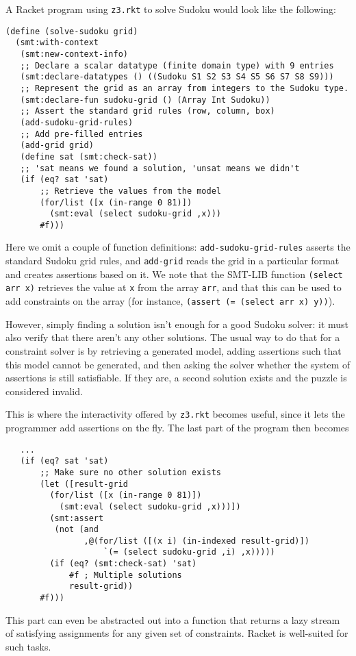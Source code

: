 A Racket program using \texttt{z3.rkt} to solve Sudoku would
look like the following:

\begin{verbatim}
(define (solve-sudoku grid)
  (smt:with-context
   (smt:new-context-info)
   ;; Declare a scalar datatype (finite domain type) with 9 entries
   (smt:declare-datatypes () ((Sudoku S1 S2 S3 S4 S5 S6 S7 S8 S9)))
   ;; Represent the grid as an array from integers to the Sudoku type.
   (smt:declare-fun sudoku-grid () (Array Int Sudoku))
   ;; Assert the standard grid rules (row, column, box)
   (add-sudoku-grid-rules)
   ;; Add pre-filled entries
   (add-grid grid)
   (define sat (smt:check-sat))
   ;; 'sat means we found a solution, 'unsat means we didn't
   (if (eq? sat 'sat)
       ;; Retrieve the values from the model
       (for/list ([x (in-range 0 81)])
         (smt:eval (select sudoku-grid ,x)))
       #f)))
\end{verbatim}

Here we omit a couple of function definitions: \texttt{add-sudoku-grid-rules}
asserts the standard Sudoku grid rules, and \texttt{add-grid} reads the grid in
a particular format and creates assertions based on it. We note that the SMT-LIB
function \texttt{(select arr x)} retrieves the value at \texttt{x} from the
array \texttt{arr}, and that this can be used to add constraints on the array
(for instance, \texttt{(assert (= (select arr x) y))}).

However, simply finding a solution isn't enough for a good Sudoku solver: it
must also verify that there aren't any other solutions. The usual way to do that
for a constraint solver is by retrieving a generated model, adding assertions
such that this model cannot be generated, and then asking the solver whether the
system of assertions is still satisfiable. If they are, a second solution
exists and the puzzle is considered invalid.

This is where the interactivity offered by \texttt{z3.rkt} becomes useful, since
it lets the programmer add assertions on the fly. The last part of the program
then becomes

\begin{verbatim}
   ...
   (if (eq? sat 'sat)
       ;; Make sure no other solution exists
       (let ([result-grid
         (for/list ([x (in-range 0 81)])
           (smt:eval (select sudoku-grid ,x)))])
         (smt:assert
          (not (and
                ,@(for/list ([(x i) (in-indexed result-grid)])
                    `(= (select sudoku-grid ,i) ,x)))))
         (if (eq? (smt:check-sat) 'sat)
             #f ; Multiple solutions
             result-grid))
       #f)))
\end{verbatim}

This part can even be abstracted out into a function that returns a lazy stream
of satisfying assignments for any given set of constraints. Racket is
well-suited for such tasks.
